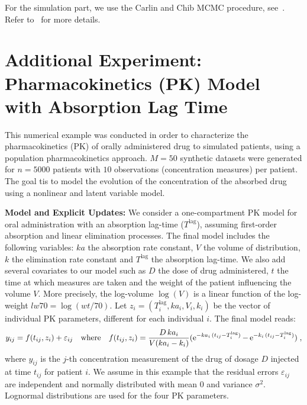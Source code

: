 \documentclass[11pt]{article}
\theoremstyle{t}
\begin{document}
For the simulation part, we use the Carlin and Chib MCMC procedure, see~\citep{carlin1995bayesian}.
Refer to~\citep{maire2016online} for more details.

\clearpage
\section{Additional Experiment: Pharmacokinetics (PK) Model with Absorption Lag Time}
This numerical example was conducted in order to characterize the pharmacokinetics (PK) of orally administered drug to simulated patients, using a population pharmacokinetics approach. $M = 50$ synthetic datasets were generated for $n = 5000$ patients with $10$ observations (concentration measures) per patient.
The goal tis to model the evolution of the concentration of the absorbed drug using a nonlinear and latent variable model. 

\textbf{Model and Explicit Updates:}
We consider a one-compartment PK model for oral administration with an absorption lag-time ($T^{\textrm{lag}}$), assuming first-order absorption and linear elimination processes.
The final model includes the following variables: $ka$ the absorption rate constant, $V$ the volume of distribution, $k$ the elimination rate constant and $T^{\textrm{lag}}$ the absorption lag-time. 
We also add several covariates to our model such as $D$ the dose of drug administered, $t$ the time at which measures are taken and the weight of the patient influencing the volume $V$. More precisely, the log-volume $\log(V)$ is a linear function of the log-weight $lw70= \log(wt/70)$.
Let $ z_i=(T_i^{\textrm{lag}}, ka_i, V_i, k_i)$ be the vector of individual PK parameters, different for each individual $i$.
The final model reads:
\begin{equation} \label{eq:pkmodel}
y_{ij} = f(t_{ij},z_i)+ \varepsilon_{ij} \quad \textrm{where} \quad f(t_{ij},z_i) = \frac{D\,ka_i}{V(ka_i - k_i)}(\exponential^{-ka_i\,(t_{ij} - T_i^{\textrm{lag}})}-\exponential^{-k_i\,(t_{ij} - T_i^{\textrm{lag}})})\eqs,
\end{equation}
where $y_{ij}$ is the $j$-th concentration measurement of the drug of dosage $D$ injected at time $t_{ij}$ for patient $i$.
We assume in this example that the residual errors $\varepsilon_{ij}$ are independent and normally distributed with mean 0 and variance $\sigma^2$.
Lognormal distributions are used for the four PK parameters.
\end{document}

